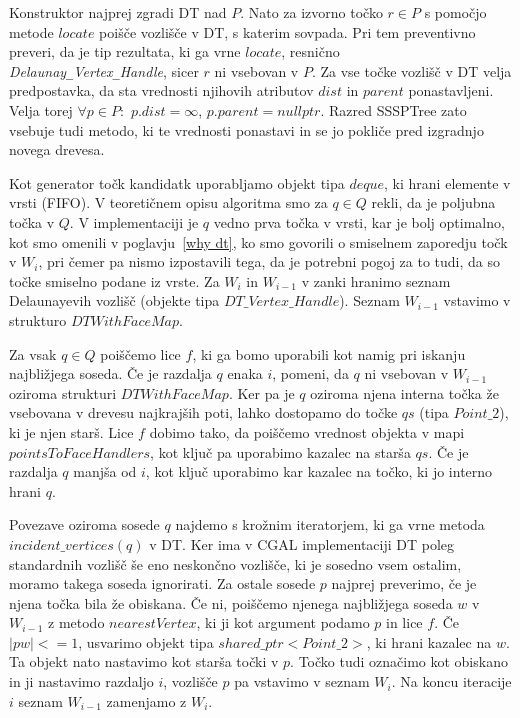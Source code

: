 \documentclass[a4paper, 12pt]{book}
\newcommand{\U}{\texttt{\_}}
\begin{document}
Konstruktor najprej zgradi DT nad $P$. Nato za izvorno točko $r\in P$ s pomočjo metode $locate$ poišče vozlišče v DT, s katerim sovpada. Pri tem preventivno preveri, da je tip rezultata, ki ga vrne $locate$, resnično \\ 
\textit{Delaunay\U Vertex\U Handle}, sicer $r$ ni vsebovan v $P$. Za vse točke vozlišč v DT velja predpostavka, da sta vrednosti njihovih atributov $dist$ in $parent$ ponastavljeni. Velja torej $\forall p\in P:$ $p.dist = \infty$,  $p.parent = nullptr$. Razred SSSPTree zato vsebuje tudi metodo, ki te vrednosti ponastavi in se jo pokliče pred izgradnjo novega drevesa.

Kot generator točk kandidatk uporabljamo objekt tipa $deque$, ki hrani elemente v vrsti (FIFO). V teoretičnem opisu algoritma smo za $q\in Q$ rekli, da je poljubna točka v $Q$. V implementaciji je $q$ vedno prva točka v vrsti, kar je bolj optimalno, kot smo omenili v poglavju~\ref{why dt}, ko smo govorili o smiselnem zaporedju točk v $W_i$, pri čemer pa nismo izpostavili tega, da je potrebni pogoj za to tudi, da so točke smiselno podane iz vrste. Za $W_i$ in $W_{i-1}$ v zanki hranimo seznam Delaunayevih vozlišč (objekte tipa $DT\U Vertex\U Handle$). Seznam $W_{i-1}$ vstavimo v strukturo $DTWithFaceMap$. 

Za vsak $q\in Q$ poiščemo lice $f$, ki ga bomo uporabili kot namig pri iskanju najbližjega soseda. Če je razdalja $q$ enaka $i$, pomeni, da $q$ ni vsebovan v $W_{i-1}$ oziroma strukturi $DTWithFaceMap$. Ker pa je $q$ oziroma njena interna točka že vsebovana v drevesu najkrajših poti, lahko dostopamo do točke $qs$ (tipa $Point\U 2$), ki je njen starš.  Lice $f$ dobimo tako, da poiščemo vrednost objekta v mapi $pointsToFaceHandlers$, kot ključ pa uporabimo kazalec na starša $qs$. Če je razdalja $q$ manjša od $i$, kot ključ uporabimo kar kazalec na točko, ki jo interno hrani $q$.  

Povezave oziroma sosede $q$ najdemo s krožnim iteratorjem, ki ga vrne metoda $incident\U vertices(q)$ v DT. Ker ima v CGAL implementaciji DT poleg standardnih vozlišč še eno neskončno vozlišče, ki je sosedno vsem ostalim, moramo takega soseda ignorirati. Za ostale sosede $p$ najprej preverimo, če je njena točka bila že obiskana. Če ni, poiščemo njenega najbližjega soseda $w$ v $W_{i-1}$ z metodo $nearestVertex$, ki ji kot argument podamo $p$ in lice $f$. Če $|pw| <= 1$, usvarimo objekt tipa $shared\U ptr<Point\U 2>$, ki hrani kazalec na $w$. Ta objekt nato nastavimo kot starša točki v $p$. Točko tudi označimo kot obiskano in ji nastavimo razdaljo $i$, vozlišče $p$ pa vstavimo v seznam $W_i$. Na koncu iteracije $i$ seznam $W_{i-1}$ zamenjamo z $W_i$.
\end{document}
